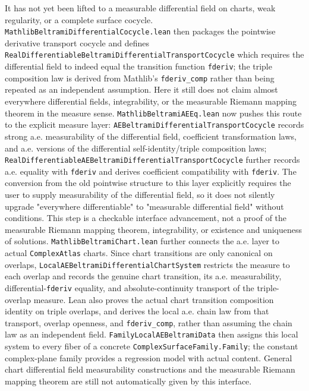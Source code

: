 \documentclass[UTF8,a4paper,11pt]{article}
\begin{document}
It has not yet been lifted to a measurable differential field on charts, weak regularity, or a complete surface cocycle.
\texttt{MathlibBeltramiDifferentialCocycle}\allowbreak\texttt{.lean} then packages the pointwise derivative transport cocycle and defines \texttt{RealDifferentiableBeltramiDifferentialTransportCocycle} which requires the differential field to indeed equal the transition function \texttt{fderiv}; the triple composition law is derived from Mathlib's \texttt{fderiv\_comp} rather than being repeated as an independent assumption. Here it still does not claim almost everywhere differential fields, integrability, or the measurable Riemann mapping theorem in the measure sense.
\texttt{MathlibBeltramiAEEq}\allowbreak\texttt{.lean} now pushes this route to the explicit measure layer:
\texttt{AEBeltramiDifferentialTransportCocycle} records strong a.e. measurability of the differential field, coefficient transformation laws, and a.e. versions of the differential self-identity/triple composition laws;
\texttt{RealDifferentiableAEBeltramiDifferentialTransportCocycle} further records a.e. equality with \texttt{fderiv} and derives coefficient compatibility with \texttt{fderiv}.
The conversion from the old pointwise structure to this layer explicitly requires the user to supply measurability of the differential field, so it does not silently upgrade "everywhere differentiable" to "measurable differential field" without conditions. This step is a checkable interface advancement, not a proof of the measurable Riemann mapping theorem, integrability, or existence and uniqueness of solutions.
\texttt{MathlibBeltramiChart}\allowbreak\texttt{.lean} further connects the a.e. layer to actual
\texttt{ComplexAtlas} charts. Since chart transitions are only canonical on overlaps,
\texttt{LocalAEBeltramiDifferentialChartSystem} restricts the measure to each overlap and records the genuine chart transition, its a.e. measurability, differential-\texttt{fderiv} equality, and absolute-continuity transport of the triple-overlap measure.
Lean also proves the actual chart transition composition identity on triple overlaps, and derives the local a.e. chain law from that transport, overlap openness, and \texttt{fderiv\_comp}, rather than assuming the chain law as an independent field.
\texttt{FamilyLocalAEBeltramiData} then assigns this local system to every fiber of a concrete
\texttt{ComplexSurfaceFamily.Family}; the constant complex-plane family provides a regression model with actual content.
General chart differential field measurability constructions and the measurable Riemann mapping theorem are still not automatically given by this interface.
\end{document}
